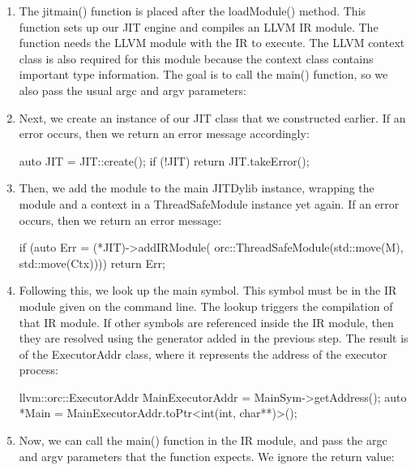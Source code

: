 \begin{enumerate}
\item
The jitmain() function is placed after the loadModule() method. This function sets up our JIT engine and compiles an LLVM IR module. The function needs the LLVM module with the IR to execute. The LLVM context class is also required for this module because the context class contains important type information. The goal is to call the main() function, so we also pass the usual argc and argv parameters:

\begin{cpp}
Error jitmain(std::unique_ptr<Module> M,
    std::unique_ptr<LLVMContext> Ctx,
    int argc, char *argv[]) {
\end{cpp}

\item
Next, we create an instance of our JIT class that we constructed earlier. If an error occurs, then we return an error message accordingly:

\begin{cpp}
auto JIT = JIT::create();
if (!JIT)
    return JIT.takeError();
\end{cpp}

\item
Then, we add the module to the main JITDylib instance, wrapping the module and a context in a ThreadSafeModule instance yet again. If an error occurs, then we return an error message:

\begin{cpp}
if (auto Err = (*JIT)->addIRModule(
        orc::ThreadSafeModule(std::move(M),
                              std::move(Ctx))))
    return Err;
\end{cpp}

\item
Following this, we look up the main symbol. This symbol must be in the IR module given on the command line. The lookup triggers the compilation of that IR module. If other symbols are referenced inside the IR module, then they are resolved using the generator added in the previous step. The result is of the ExecutorAddr class, where it represents the address of the executor process:

\begin{cpp}
    llvm::orc::ExecutorAddr MainExecutorAddr = MainSym->getAddress();
    auto *Main = MainExecutorAddr.toPtr<int(int, char**)>();
\end{cpp}

\item
Now, we can call the main() function in the IR module, and pass the argc and argv parameters that the function expects. We ignore the return value:


\end{enumerate}
